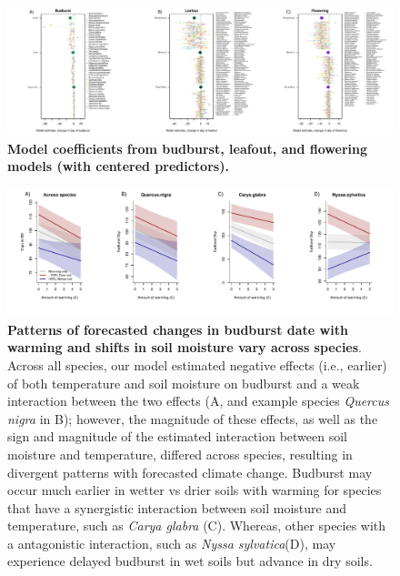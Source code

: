 \documentclass{article}
\begin{document}
\begin{figure}[h]
\centering
 \includegraphics{../../Analyses/soilmoisture/figures/m5_bbdlofl.pdf}
 \caption{\textbf{Model coefficients from budburst, leafout, and flowering models (with centered predictors).}} 
 \label{fig:bblofl}
 \end{figure}
 

 \begin{figure}[h]
\centering
 \includegraphics{../../Analyses/soilmoisture/figures/tempforecast_bb_0_5_135_28_105_4_degwarm.pdf}
 
 \caption{\textbf{Patterns of forecasted changes in budburst date with warming and shifts in soil moisture vary across species}. Across all species, our model estimated negative effects (i.e., earlier) of both temperature and soil moisture on budburst and a weak interaction between the two effects (A, and example species \textit{Quercus nigra} in B); however, the magnitude of these effects, as well as the sign and magnitude of the estimated interaction between soil moisture and temperature, differed across species, resulting in divergent patterns with forecasted climate change. Budburst may occur much earlier in wetter vs drier soils with warming for species that have a synergistic interaction between soil moisture and temperature, such as \textit{Carya glabra} (C). Whereas, other species with a antagonistic interaction, such as \textit{Nyssa sylvatica}(D), may experience delayed budburst in wet soils but advance in dry soils.}
 \label{fig:bbsp}
 \end{figure}

\end{document}
